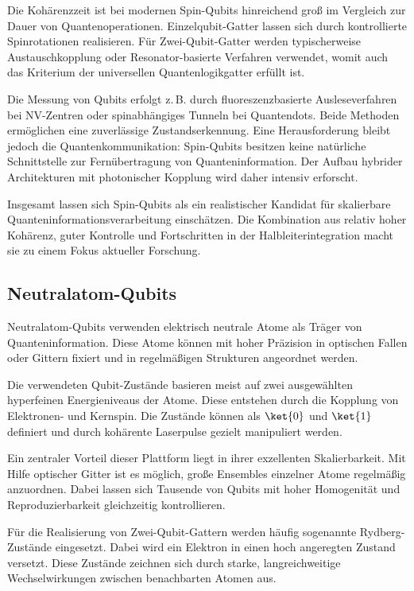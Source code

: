 Die Kohärenzzeit ist bei modernen Spin-Qubits hinreichend groß im Vergleich zur Dauer von Quantenoperationen. Einzelqubit-Gatter lassen sich durch kontrollierte Spinrotationen realisieren. Für Zwei-Qubit-Gatter werden typischerweise Austauschkopplung oder Resonator-basierte Verfahren verwendet, womit auch das Kriterium der universellen Quantenlogikgatter erfüllt ist.

Die Messung von Qubits erfolgt z.\,B. durch fluoreszenzbasierte Ausleseverfahren bei NV-Zentren oder spinabhängiges Tunneln bei Quantendots. Beide Methoden ermöglichen eine zuverlässige Zustandserkennung. Eine Herausforderung bleibt jedoch die Quantenkommunikation: Spin-Qubits besitzen keine natürliche Schnittstelle zur Fernübertragung von Quanteninformation. Der Aufbau hybrider Architekturen mit photonischer Kopplung wird daher intensiv erforscht.

Insgesamt lassen sich Spin-Qubits als ein realistischer Kandidat für skalierbare Quanteninformationsverarbeitung einschätzen. Die Kombination aus relativ hoher Kohärenz, guter Kontrolle und Fortschritten in der Halbleiterintegration macht sie zu einem Fokus aktueller Forschung.


\subsection{Neutralatom-Qubits}
\label{subsec: Neutralatom-Qubits}

Neutralatom-Qubits verwenden elektrisch neutrale Atome als Träger von Quanteninformation. Diese Atome können mit hoher Präzision in optischen Fallen oder Gittern fixiert und in regelmäßigen Strukturen angeordnet werden.

Die verwendeten Qubit-Zustände basieren meist auf zwei ausgewählten hyperfeinen Energieniveaus der Atome. Diese entstehen durch die Kopplung von Elektronen- und Kernspin. Die Zustände können als  $\ket{0}$ und $\ket{1}$ definiert und durch kohärente Laserpulse gezielt manipuliert werden.

Ein zentraler Vorteil dieser Plattform liegt in ihrer exzellenten Skalierbarkeit. Mit Hilfe optischer Gitter ist es möglich, große Ensembles einzelner Atome regelmäßig anzuordnen. Dabei lassen sich Tausende von Qubits mit hoher Homogenität und Reproduzierbarkeit gleichzeitig kontrollieren.

Für die Realisierung von Zwei-Qubit-Gattern werden häufig sogenannte Rydberg-Zustände eingesetzt. Dabei wird ein Elektron in einen hoch angeregten Zustand versetzt. Diese Zustände zeichnen sich durch starke, langreichweitige Wechselwirkungen zwischen benachbarten Atomen aus.

